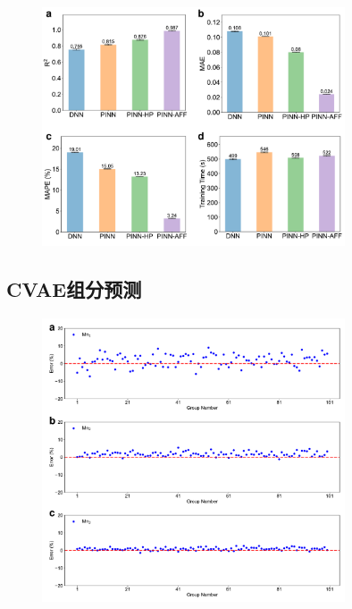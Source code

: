 \begin{figure}[htbp]
  \centering
  \includegraphics[width=0.8\textwidth]{Fig/pfgs-com-metrics.pdf}
\end{figure}
\subsection{CVAE组分预测}
\begin{figure}[htbp]
  \centering
  \includegraphics[width=0.8\textwidth]{Fig/reverse-redisual-Mn.pdf}
\end{figure}

